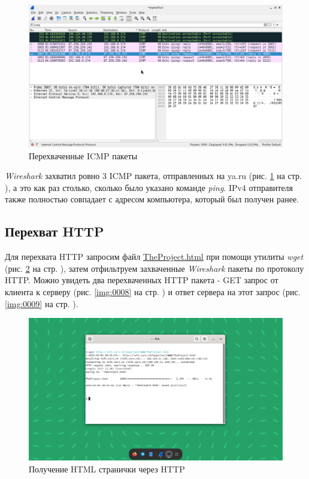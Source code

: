 \documentclass[a4paper]{article}
\begin{document}
  \begin{figure}[H]
    \centering
    \includegraphics[width=1.0\textwidth]{01_0006}
    \caption{Перехваченные ICMP пакеты}
    \label{img:0006}
  \end{figure}

  \textit{Wireshark} захватил ровно 3 ICMP пакета, отправленных на ya.ru (рис. \ref{img:0006}
  на стр. \pageref{img:0006}), а это как раз столько, сколько было указано команде \textit{ping}.
  IPv4 отправителя также полностью совпадает с адресом компьютера, который был получен ранее.

  \subsection{Перехват HTTP}

  Для перехвата HTTP запросим файл \href{http://info.cern.ch/hypertext/WWW/TheProject.html}{TheProject.html} при 
  помощи утилиты \textit{wget} (рис. \ref{img:0007} на стр. \pageref{img:0007}), затем отфильтруем захваченные \textit{Wireshark} пакеты по 
  протоколу HTTP. Можно увидеть два перехваченных HTTP пакета - GET запрос от клиента к серверу
  (рис. \ref{img:0008} на стр. \pageref{img:0008}) и ответ сервера на этот запрос
  (рис. \ref{img:0009} на стр. \pageref{img:0009}).

  \begin{figure}[H]
    \centering
    \includegraphics[width=1.0\textwidth]{01_0007}
    \caption{Получение HTML странички через HTTP}
    \label{img:0007}
  \end{figure}
\end{document}
